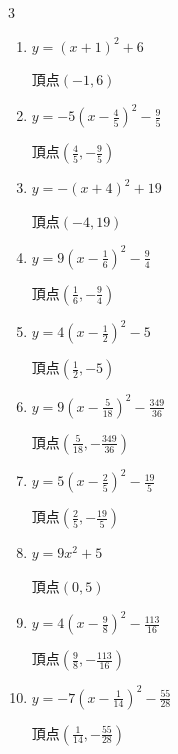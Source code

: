 \begin{multicols}{3}
\begin{enumerate}
        $\displaystyle 頂点\left( \frac{9}{8} , -\frac{49}{16} \right)$

  \item $\displaystyle y=\left( x+1\right)^{2}+6$

        $\displaystyle 頂点\left( -1 , 6 \right)$

  \item $\displaystyle y=-5\left( x-\frac{4}{5}\right)^{2}-\frac{9}{5}$

        $\displaystyle 頂点\left( \frac{4}{5} , -\frac{9}{5} \right)$

  \item $\displaystyle y=-\left( x+4\right)^{2}+19$

        $\displaystyle 頂点\left( -4 , 19 \right)$

  \item $\displaystyle y=9\left( x-\frac{1}{6}\right)^{2}-\frac{9}{4}$

        $\displaystyle 頂点\left( \frac{1}{6} , -\frac{9}{4} \right)$

\columnbreak %

  \item $\displaystyle y=4\left( x-\frac{1}{2}\right)^{2}-5$

        $\displaystyle 頂点\left( \frac{1}{2} , -5 \right)$

  \item $\displaystyle y=9\left( x-\frac{5}{18}\right)^{2}-\frac{349}{36}$

        $\displaystyle 頂点\left( \frac{5}{18} , -\frac{349}{36} \right)$

  \item $\displaystyle y=5\left( x-\frac{2}{5}\right)^{2}-\frac{19}{5}$

        $\displaystyle 頂点\left( \frac{2}{5} , -\frac{19}{5} \right)$

  \item $\displaystyle y=9x^{2}+5$

        $\displaystyle 頂点\left( 0 , 5 \right)$

  \item $\displaystyle y=4\left( x-\frac{9}{8}\right)^{2}-\frac{113}{16}$

        $\displaystyle 頂点\left( \frac{9}{8} , -\frac{113}{16} \right)$

  \item $\displaystyle y=-7\left( x-\frac{1}{14}\right)^{2}-\frac{55}{28}$

        $\displaystyle 頂点\left( \frac{1}{14} , -\frac{55}{28} \right)$


\end{enumerate}
\end{multicols}
